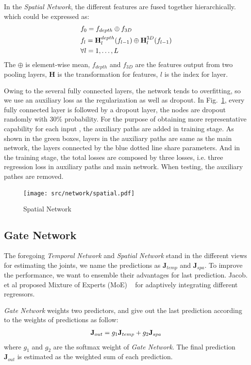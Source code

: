 \documentclass[journal,comsoc]{IEEEtran}
\let\MYoriglatexcaption\caption
\renewcommand{\caption}[2][\relax]{\MYoriglatexcaption[#2]{#2}}
\newcommand{\J}{\textbf{J}}
\begin{document}
In the \emph{Spatial Network}, the different features are fused together hierarchically.
which could be expressed as:
\begin{equation}\label{eq:deep fusion}
\begin{aligned}
&f_0 = f_{depth} \oplus f_{3D} \\
&f_l = \textbf{H}_l^{depth}(f_{l-1}) \oplus \textbf{H}_l^{3D}(f_{l-1}) \\
&\forall l=1, \dots , L
\vspace{1em}
\end{aligned}
\end{equation}
The $\oplus$ is element-wise mean, $f_{depth}$ and $f_{3D}$ are the features output from
two pooling layers, $\textbf{H}$ is the transformation for features,
$l$ is the index for layer.

Owing to the several fully connected layers, the network tends to overfitting, so we use
an auxiliary loss as the regularization as well as dropout. In Fig.~\ref{fig:spatial network},
every fully connected layer is followed by a dropout layer, the nodes are dropout randomly
with 30\% probability. For the purpose of obtaining more representative capability for each input
, the auxiliary paths are added in training stage. As shown in the green boxes, layers in the
auxiliary paths are same as the main network, the layers connected by the blue dotted line
share parameters. And in the training stage, the total losses are composed by three losses,
i.e. three regression loss in auxiliary paths and main network. When testing, the auxiliary
pathes are removed.
\begin{figure}[t]
    \centering
    \texttt{[image: src/network/spatial.pdf]}
    \caption{Spatial Network}
\label{fig:spatial network}
\end{figure}

\subsection{Gate Network}\label{sec:gate network}
The foregoing \emph{Temporal Network} and \emph{Spatial Network} stand in the different views
for estimating the joints, we name the predictions as $\J_{temp}$ and $\J_{spa}$. To improve
the performance, we want to ensemble their advantages for last prediction. Jacob. et al
proposed Mixture of Experts (MoE) ~\cite{jacobs1991adaptive} for adaptively integrating
different regressors.

\emph{Gate Network} weights two predictors, and give out the last prediction according to
the weights of predictions as follow:
\begin{equation}\label{eq:gating network}
\centering
\textbf{J}_{out} = g_1 \J_{temp} + g_2 \J_{spa}
\end{equation}
where $g_1$ and $g_2$ are the softmax weight of \emph{Gate Network}. The final prediction
$\textbf{J}_{out}$ is estimated as the weighted sum of each prediction.
\end{document}
